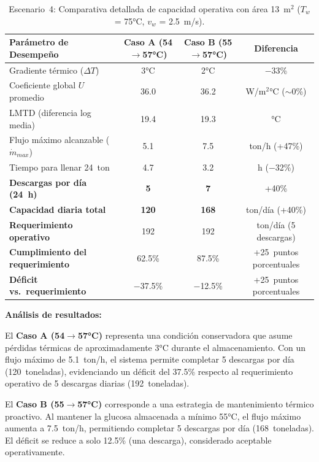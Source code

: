 \begin{table}[H]
\centering
\caption{Escenario~4: Comparativa detallada de capacidad operativa con área 13~m$^2$ ($T_w$ = 75°C, $v_w$ = 2.5~m/s).}
\label{tab:resumen_esc4_capacidad}
\setcounter{itemcount}{0}
\begin{tabularx}{\textwidth}{@{}Xccc@{}}
\toprule
\textbf{Parámetro de Desempeño} & \textbf{Caso A (54$\rightarrow$57°C)} & \textbf{Caso B (55$\rightarrow$57°C)} & \textbf{Diferencia} \\
\midrule
Gradiente térmico ($\Delta T$) & 3°C & 2°C & $-$33\% \\
Coeficiente global $U$ promedio & 36.0 & 36.2 & W/m$^2$°C ($\sim$0\%) \\
LMTD (diferencia log media) & 19.4 & 19.3 & °C \\
Flujo máximo alcanzable ($\dot{m}_{max}$) & 5.1 & 7.5 & ton/h (+47\%) \\
Tiempo para llenar 24~ton & 4.7 & 3.2 & h ($-$32\%) \\
\midrule
\textbf{Descargas por día (24~h)} & \textbf{5} & \textbf{7} & +40\% \\
\textbf{Capacidad diaria total} & \textbf{120} & \textbf{168} & ton/día (+40\%) \\
\textbf{Requerimiento operativo} & 192 & 192 & ton/día (5 descargas) \\
\textbf{Cumplimiento del requerimiento} & 62.5\% & 87.5\% & +25~puntos porcentuales \\
\textbf{Déficit vs.~requerimiento} & $-$37.5\% & $-$12.5\% & +25~puntos porcentuales \\
\bottomrule
\end{tabularx}
\end{table}

\textbf{Análisis de resultados:}

El \textbf{Caso A (54$\rightarrow$57°C)} representa una condición conservadora que asume pérdidas térmicas de aproximadamente 3°C durante el almacenamiento. Con un flujo máximo de 5.1~ton/h, el sistema permite completar 5 descargas por día (120~toneladas), evidenciando un déficit del 37.5\% respecto al requerimiento operativo de 5 descargas diarias (192~toneladas).

El \textbf{Caso B (55$\rightarrow$57°C)} corresponde a una estrategia de mantenimiento térmico proactivo. Al mantener la glucosa almacenada a mínimo 55°C, el flujo máximo aumenta a 7.5~ton/h, permitiendo completar 5 descargas por día (168~toneladas). El déficit se reduce a solo 12.5\% (una descarga), considerado aceptable operativamente.

